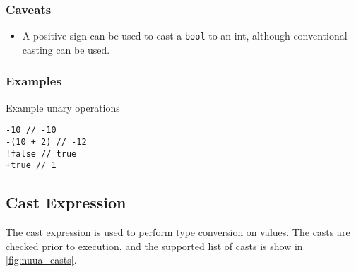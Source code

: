 \subsubsection{Caveats}

\begin{itemize}
    \item A positive sign can be used to cast a \texttt{bool} to an int, although conventional casting can be used.
\end{itemize}

\subsubsection{Examples}

Example unary operations
\begin{lstlisting}
-10 // -10
-(10 + 2) // -12
!false // true
+true // 1
\end{lstlisting}

\subsection{Cast Expression}

The cast expression is used to perform type conversion on values. The casts are checked prior to execution, and the supported list
of casts is show in \autoref{fig:nuua_casts}.

